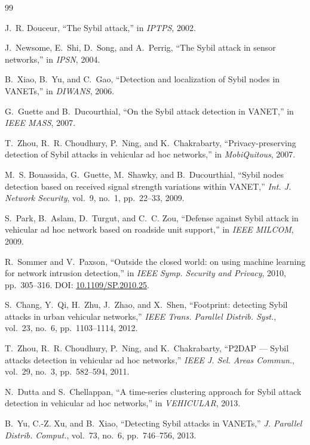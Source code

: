 \documentclass[journal,twoside]{IEEEtran}
\begin{document}
\begin{thebibliography}{99}

 J.~R. Douceur, ``The Sybil attack,'' in \emph{IPTPS}, 2002.

 J.~Newsome, E.~Shi, D.~Song, and A.~Perrig, ``The Sybil attack in sensor networks,'' in \emph{IPSN}, 2004.

 B.~Xiao, B.~Yu, and C.~Gao, ``Detection and localization of Sybil nodes in VANETs,'' in \emph{DIWANS}, 2006.

 G.~Guette and B.~Ducourthial, ``On the Sybil attack detection in VANET,'' in \emph{IEEE MASS}, 2007.

 T.~Zhou, R.~R. Choudhury, P.~Ning, and K.~Chakrabarty, ``Privacy-preserving detection of Sybil attacks in vehicular ad hoc networks,'' in \emph{MobiQuitous}, 2007.

 M.~S. Bouassida, G.~Guette, M.~Shawky, and B.~Ducourthial, ``Sybil nodes detection based on received signal strength variations within VANET,'' \emph{Int. J. Network Security}, vol.~9, no.~1, pp.~22--33, 2009.

 S.~Park, B.~Aslam, D.~Turgut, and C.~C. Zou, ``Defense against Sybil attack in vehicular ad hoc network based on roadside unit support,'' in \emph{IEEE MILCOM}, 2009.

 R.~Sommer and V.~Paxson, ``Outside the closed world: on using machine learning for network intrusion detection,'' in \emph{IEEE Symp. Security and Privacy}, 2010, pp.~305--316. DOI: \url{10.1109/SP.2010.25}.

 S.~Chang, Y.~Qi, H.~Zhu, J.~Zhao, and X.~Shen, ``Footprint: detecting Sybil attacks in urban vehicular networks,'' \emph{IEEE Trans. Parallel Distrib. Syst.}, vol.~23, no.~6, pp.~1103--1114, 2012.

 T.~Zhou, R.~R. Choudhury, P.~Ning, and K.~Chakrabarty, ``P2DAP --- Sybil attacks detection in vehicular ad hoc networks,'' \emph{IEEE J. Sel. Areas Commun.}, vol.~29, no.~3, pp.~582--594, 2011.

 N.~Dutta and S.~Chellappan, ``A time-series clustering approach for Sybil attack detection in vehicular ad hoc networks,'' in \emph{VEHICULAR}, 2013.

 B.~Yu, C.-Z. Xu, and B.~Xiao, ``Detecting Sybil attacks in VANETs,'' \emph{J. Parallel Distrib. Comput.}, vol.~73, no.~6, pp.~746--756, 2013.


\end{thebibliography}
\end{document}
